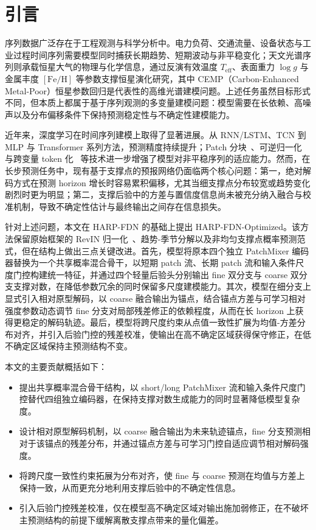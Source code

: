 \documentclass[journal]{IEEEtran}
\begin{document}
\IEEEpeerreviewmaketitle

\section{引言}
\label{sec:introduction}

序列数据广泛存在于工程观测与科学分析中。电力负荷、交通流量、设备状态与工业过程时间序列需要模型同时捕获长期趋势、短期波动与非平稳变化；天文光谱序列则承载恒星大气的物理与化学信息，通过反演有效温度 $T_{\mathrm{eff}}$、表面重力 $\log g$ 与金属丰度 $[\mathrm{Fe/H}]$ 等参数支撑恒星演化研究，其中 CEMP（Carbon-Enhanced Metal-Poor）恒星参数回归是代表性的高维光谱建模问题。上述任务虽然目标形式不同，但本质上都属于基于序列观测的多变量建模问题：模型需要在长依赖、高噪声以及分布偏移条件下保持预测稳定性与不确定性建模能力。

近年来，深度学习在时间序列建模上取得了显著进展。从 RNN/LSTM、TCN 到 MLP 与 Transformer 系列方法，预测精度持续提升；Patch 分块~\cite{patchtst}、可逆归一化~\cite{revin} 与跨变量 token 化~\cite{itransformer} 等技术进一步增强了模型对非平稳序列的适应能力。然而，在长步预测任务中，现有基于支撑点的预报网络仍面临两个核心问题：第一，绝对解码方式在预测 horizon 增长时容易累积偏移，尤其当细支撑点分布较宽或趋势变化剧烈时更为明显；第二，支撑后验中的方差与置信度信息尚未被充分纳入融合与校准机制，导致不确定性估计与最终输出之间存在信息损失。

针对上述问题，本文在 HARP-FDN 的基础上提出 HARP-FDN-Optimized。该方法保留原始框架的 RevIN 归一化~\cite{revin}、趋势-季节分解以及非均匀支撑点概率预测范式，但在结构上做出三点关键改进。首先，模型将原本四个独立 PatchMixer 编码器替换为一个共享概率混合骨干，以短期 patch 流、长期 patch 流和输入条件尺度门控构建统一特征，并通过四个轻量后验头分别输出 fine 双分支与 coarse 双分支支撑对数，在降低参数冗余的同时保留多尺度建模能力。其次，模型在细分支上显式引入相对原型解码，以 coarse 融合输出为锚点，结合锚点方差与可学习相对强度参数动态调节 fine 分支对局部残差修正的依赖程度，从而在长 horizon 上获得更稳定的解码轨迹。最后，模型将跨尺度约束从点值一致性扩展为均值-方差分布对齐，并引入后验门控的残差校准，使输出在高不确定区域获得保守修正，在低不确定区域保持主预测结构不变。

本文的主要贡献概括如下：
\begin{itemize}
  \item 提出共享概率混合骨干结构，以 short/long PatchMixer 流和输入条件尺度门控替代四组独立编码器，在保持支撑对数生成能力的同时显著降低模型复杂度。
  \item 设计相对原型解码机制，以 coarse 融合输出为未来轨迹锚点，fine 分支预测相对于该锚点的残差分布，并通过锚点方差与可学习门控自适应调节相对解码强度。
  \item 将跨尺度一致性约束拓展为分布对齐，使 fine 与 coarse 预测在均值与方差上保持一致，从而更充分地利用支撑后验中的不确定性信息。
  \item 引入后验门控残差校准，仅在模型高不确定区域对输出施加弱修正，在不破坏主预测结构的前提下缓解离散支撑点带来的量化偏差。
\end{itemize}
\end{document}
